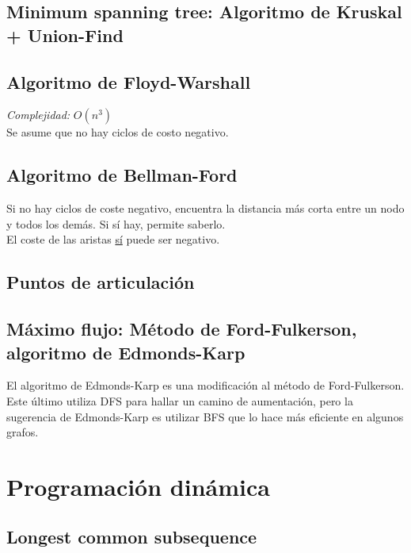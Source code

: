 \documentclass[10pt,letterpaper]{article}
\begin{document}

\subsection{Minimum spanning tree: Algoritmo de Kruskal + Union-Find}

\subsection{Algoritmo de Floyd-Warshall}
\emph{Complejidad:} $ O(n^3) $ \\
Se asume que no hay ciclos de costo negativo.

\subsection{Algoritmo de Bellman-Ford}
Si no hay ciclos de coste negativo, encuentra la distancia más corta entre un nodo
y todos los demás. Si sí hay, permite saberlo. \\
El coste de las aristas \underline{sí} puede ser negativo.

\subsection{Puntos de articulación}

\subsection{Máximo flujo: Método de Ford-Fulkerson, algoritmo de Edmonds-Karp}
El algoritmo de Edmonds-Karp es una modificación al método de Ford-Fulkerson. Este último
utiliza DFS para hallar un camino de aumentación, pero la sugerencia de Edmonds-Karp
es utilizar BFS que lo hace más eficiente en algunos grafos.

\section{Programación dinámica}
\subsection{Longest common subsequence}
\end{document}
